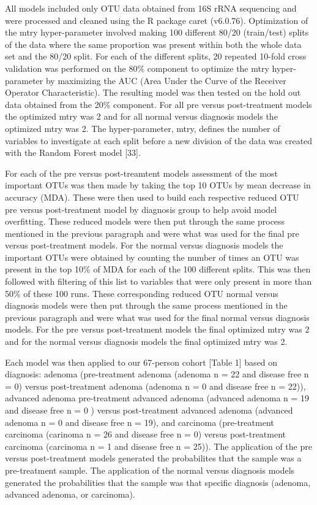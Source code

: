 \documentclass[12pt,]{article}
\begin{document}
All models included only OTU data obtained from 16S rRNA sequencing and
were processed and cleaned using the R package caret (v6.0.76).
Optimization of the mtry hyper-parameter involved making 100 different
80/20 (train/test) splits of the data where the same proportion was
present within both the whole data set and the 80/20 split. For each of
the different splits, 20 repeated 10-fold cross validation was performed
on the 80\% component to optimize the mtry hyper-parameter by maximizing
the AUC (Area Under the Curve of the Receiver Operator Characteristic).
The resulting model was then tested on the hold out data obtained from
the 20\% component. For all pre versus post-treatment models the
optimized mtry was 2 and for all normal versus diagnosis models the
optimized mtry was 2. The hyper-parameter, mtry, defines the number of
variables to investigate at each split before a new division of the data
was created with the Random Forest model {[}33{]}.

For each of the pre versus post-treamtent models assessment of the most
important OTUs was then made by taking the top 10 OTUs by mean decrease
in accuracy (MDA). These were then used to build each respective reduced
OTU pre versus post-treatment model by diagnosis group to help avoid
model overfitting. These reduced models were then put through the same
process mentioned in the previous paragraph and were what was used for
the final pre versus post-treatment models. For the normal versus
diagnosis models the important OTUs were obtained by counting the number
of times an OTU was present in the top 10\% of MDA for each of the 100
different splits. This was then followed with filtering of this list to
variables that were only present in more than 50\% of these 100 runs.
These corresponding reduced OTU normal versus diagnosis models were then
put through the same process mentioned in the previous paragraph and
were what was used for the final normal versus diagnosis models. For the
pre versus post-treatment models the final optimized mtry was 2 and for
the normal versus diagnosis models the final optimized mtry was 2.

Each model was then applied to our 67-person cohort {[}Table 1{]} based
on diagnosis: adenoma (pre-treatment adenoma (adenoma n = 22 and disease
free n = 0) versus post-treatment adenoma (adenoma n = 0 and disease
free n = 22)), advanced adenoma pre-treatment advanced adenoma (advanced
adenoma n = 19 and disease free n = 0 ) versus post-treatment advanced
adenoma (advanced adenoma n = 0 and disease free n = 19), and carcinoma
(pre-treatment carcinoma (carinoma n = 26 and disease free n = 0) versus
post-treatment carcinoma (carcinoma n = 1 and disease free n = 25)). The
application of the pre versus post-treatment models generated the
probabilites that the sample was a pre-treatment sample. The application
of the normal versus diagnosis models generated the probabilities that
the sample was that specific diagnosis (adenoma, advanced adenoma, or
carcinoma).
\end{document}
